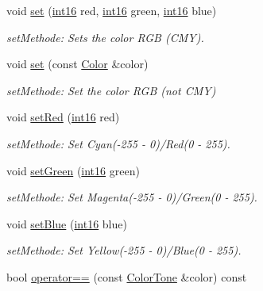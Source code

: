 \begin{DoxyCompactItemize}
void \hyperlink{class_f2_c_1_1_color_tone_a687200e3fcb535f53b37e6ed664ac1b9}{set} (\hyperlink{namespace_f2_c_ab83c1e14d784a7d520d770ca6fa8fd8e}{int16} red, \hyperlink{namespace_f2_c_ab83c1e14d784a7d520d770ca6fa8fd8e}{int16} green, \hyperlink{namespace_f2_c_ab83c1e14d784a7d520d770ca6fa8fd8e}{int16} blue)
\begin{DoxyCompactList}\small\item\em setMethode: Sets the color RGB (CMY). \item\end{DoxyCompactList}\item 
void \hyperlink{class_f2_c_1_1_color_tone_a22b9b459245bb4606a9562a070dceeae}{set} (const \hyperlink{class_f2_c_1_1_color}{Color} \&color)
\begin{DoxyCompactList}\small\item\em setMethode: Set the color RGB (not CMY) \item\end{DoxyCompactList}\item 
void \hyperlink{class_f2_c_1_1_color_tone_a269d5e83e4db3636641a72cd65763589}{setRed} (\hyperlink{namespace_f2_c_ab83c1e14d784a7d520d770ca6fa8fd8e}{int16} red)
\begin{DoxyCompactList}\small\item\em setMethode: Set Cyan(-\/255 -\/ 0)/Red(0 -\/ 255). \item\end{DoxyCompactList}\item 
void \hyperlink{class_f2_c_1_1_color_tone_a184ce7d0ea7b172138dea5fc6e5a1cdf}{setGreen} (\hyperlink{namespace_f2_c_ab83c1e14d784a7d520d770ca6fa8fd8e}{int16} green)
\begin{DoxyCompactList}\small\item\em setMethode: Set Magenta(-\/255 -\/ 0)/Green(0 -\/ 255). \item\end{DoxyCompactList}\item 
void \hyperlink{class_f2_c_1_1_color_tone_a6fb186c7fd68c103669f12ba4ee1fb00}{setBlue} (\hyperlink{namespace_f2_c_ab83c1e14d784a7d520d770ca6fa8fd8e}{int16} blue)
\begin{DoxyCompactList}\small\item\em setMethode: Set Yellow(-\/255 -\/ 0)/Blue(0 -\/ 255). \item\end{DoxyCompactList}\item 
\hypertarget{class_f2_c_1_1_color_tone_a7f40ca41a00b8cc9f93b72a28682278c}{
bool \hyperlink{class_f2_c_1_1_color_tone_a7f40ca41a00b8cc9f93b72a28682278c}{operator==} (const \hyperlink{class_f2_c_1_1_color_tone}{ColorTone} \&color) const }
\label{class_f2_c_1_1_color_tone_a7f40ca41a00b8cc9f93b72a28682278c}


\end{DoxyCompactItemize}
